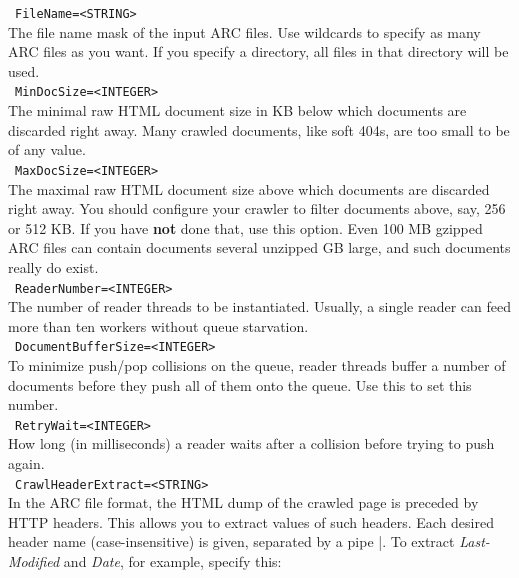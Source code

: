 \documentclass[12pt,a4paper]{article}
\begin{document}
\noindent\textbullet~\texttt{FileName=<STRING>}\\

The file name mask of the input ARC files.
Use wildcards to specify as many ARC files as you want.
If you specify a directory, all files in that directory will be used.\\

\noindent\textbullet~\texttt{MinDocSize=<INTEGER>}\\

The minimal raw HTML document size in KB below which documents are discarded right away.
Many crawled documents, like soft 404s, are too small to be of any value.\\

\noindent\textbullet~\texttt{MaxDocSize=<INTEGER>}\\

The maximal raw HTML document size above which documents are discarded right away.
You should configure your crawler to filter documents above, say, 256 or 512 KB.
If you have \textbf{not} done that, use this option.
Even 100 MB gzipped ARC files can contain documents several unzipped GB large, and such documents really do exist.\\

\noindent\textbullet~\texttt{ReaderNumber=<INTEGER>}\\

The number of reader threads to be instantiated.
Usually, a single reader can feed more than ten workers without queue starvation.\\

\noindent\textbullet~\texttt{DocumentBufferSize=<INTEGER>}\\

To minimize push\slash pop collisions on the queue, reader threads buffer a number of documents before they push all of them onto the queue.
Use this to set this number.\\

\noindent\textbullet~\texttt{RetryWait=<INTEGER>}\\

How long (in milliseconds) a reader waits after a collision before trying to push again.\\

\noindent\textbullet~\texttt{CrawlHeaderExtract=<STRING>}\\

In the ARC file format, the HTML dump of the crawled page is preceded by HTTP headers.
This allows you to extract values of such headers.
Each desired header name (case-insensitive) is given, separated by a pipe |.
To extract \textit{Last-Modified} and \textit{Date}, for example, specify this:
\end{document}
